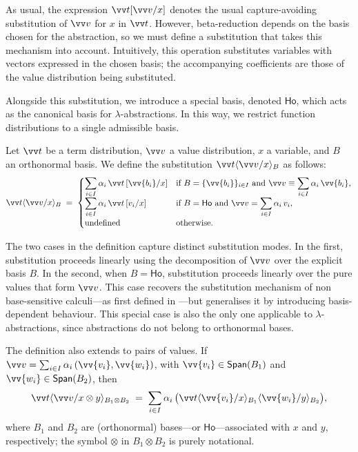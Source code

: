 \documentclass[runningheads,orivec,envcountsame,envcountsect]{llncs}
\newcommand\Span[1]{\ensuremath{{\mathsf{Span}}{#1}}}
\newcommand\ansubst[2]{\ensuremath{\langle #1 \rangle_{#2}}}
\newcommand\AbsBasis{\ensuremath{\mathsf{Ho}}}
\def\Pair#1#2{(#1,#2)} %
\def\ds{\displaystyle}
\begin{document}
As usual, the expression $\vv t[\vv v/x]$ denotes the
usual capture-avoiding substitution of $\vv v$ for $x$ in $\vv t$.
However, beta-reduction depends on the basis chosen for the abstraction, so we must
define a substitution that takes this mechanism into account. Intuitively, this
operation substitutes variables with vectors expressed in the chosen basis; the
accompanying coefficients are those of the value distribution being
substituted.

Alongside this substitution, we introduce a special basis, denoted
$\AbsBasis$, which acts as the canonical basis for $\lambda$-abstractions. In
this way, we restrict function distributions to a single admissible basis.


\begin{definition}
  Let $\vv t$ be a term distribution, $\vv v$ a value distribution, $x$ a
  variable, and $B$ an orthonormal basis. We define the substitution
  $\vv t\ansubst{\vv v/x}{B}$ as follows:
  \[
    \vv t\ansubst{\vv v/x}{B} \;=\;
    \begin{cases}
      \ds\sum_{i\in I}\alpha_i\,\vv t\,[\vv{b_i}/x] &
        \text{if } B=\{\vv{b_i}\}_{i\in I}\ \text{and}\
        \vv v \equiv \ds\sum_{i\in I}\alpha_i\,\vv{b_i},\\[6pt]
      \ds\sum_{i\in I}\alpha_i\,\vv t\,[v_i/x] &
        \text{if } B=\AbsBasis\ \text{and}\
        \vv v = \ds\sum_{i\in I}\alpha_i\,v_i,\\[2pt]
      \text{undefined} & \text{otherwise.}
    \end{cases}
  \]
\end{definition}

The two cases in the definition capture distinct substitution modes.  
In the first, substitution proceeds linearly using the decomposition of
$\vv v$ over the explicit basis $B$.  
In the second, when $B=\AbsBasis$, substitution proceeds linearly over the pure
values that form $\vv v$.  
This case recovers the substitution mechanism of 
non base-sensitive calculi---as first defined in
\cite{ArrighiDowekLMCS17}---but generalises it by introducing
basis-dependent behaviour.  
This special case is also the only one applicable to
$\lambda$-abstractions, since abstractions do not belong to orthonormal bases.

  The definition also extends to pairs of values. If
  $\vv v=\sum_{i\in I}\alpha_i\,\Pair{\vv{v_i}}{\vv{w_i}}$,
  with $\vv{v_i}\in\Span(B_1)$ and $\vv{w_i}\in\Span(B_2)$,
  then
  \[
    \vv t\ansubst{\vv v/x\otimes y}{B_1\otimes B_2}
      \;=\; \sum_{i\in I}\alpha_i\,
      \bigl(\vv t\ansubst{\vv{v_i}/x}{B_1}\ansubst{\vv{w_i}/y}{B_2}\bigr),
  \]
  where $B_1$ and $B_2$ are (orthonormal) bases---or $\AbsBasis$---associated
  with $x$ and $y$, respectively; the symbol $\otimes$ in $B_1\otimes B_2$ is
  purely notational.
\end{document}
